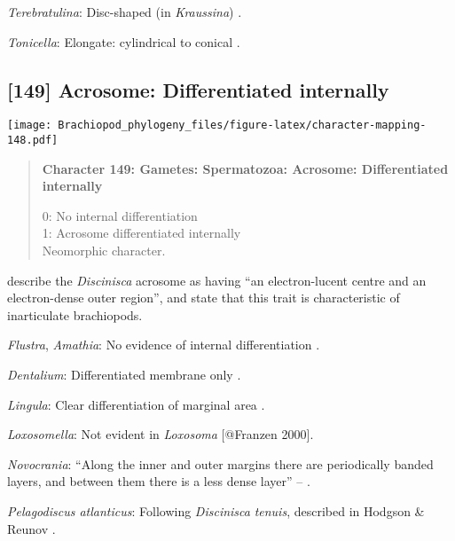 \documentclass[openany]{book}
\theoremstyle{definition}
\theoremstyle{definition}
\theoremstyle{definition}
\theoremstyle{remark}
\begin{document}
\hypertarget{Terebratulina-coding-148}{}
\emph{Terebratulina}: Disc-shaped (in \emph{Kraussina})
\citep{Hodgson1994Ultrastructureof}.

\hypertarget{Tonicella-coding-148}{}
\emph{Tonicella}: Elongate: cylindrical to conical
\citep{BucklandNicks1988}.

\subsection*{{[}149{]} Acrosome: Differentiated
internally}\label{acrosome-differentiated-internally}

\texttt{[image: Brachiopod\_phylogeny\_files/figure-latex/character-mapping-148.pdf]}

\begin{quote}
\textbf{Character 149: Gametes: Spermatozoa: Acrosome: Differentiated
internally}

0: No internal differentiation\\
1: Acrosome differentiated internally\\
Neomorphic character.
\end{quote}

\citet{Hodgson1994Ultrastructureof} describe the \emph{Discinisca}
acrosome as having ``an electron-lucent centre and an electron-dense
outer region'', and state that this trait is characteristic of
inarticulate brachiopods.

\hypertarget{Amathia-coding-149}{}
\emph{Flustra}, \emph{Amathia}: No evidence of internal differentiation
\citep[in \emph{Tubulipora};][]{Franzen1984}.

\hypertarget{Dentalium-coding-149}{}
\emph{Dentalium}: Differentiated membrane only \citep{DufresneDube1983}.

\hypertarget{Lingula-coding-149}{}
\emph{Lingula}: Clear differentiation of marginal area
\citep{Fukumoto2003Theacrosome}.

\hypertarget{Loxosomella-coding-149}{}
\emph{Loxosomella}: Not evident in \emph{Loxosoma} {[}@Franzen 2000{]}.

\hypertarget{Novocrania-coding-149}{}
\emph{Novocrania}: ``Along the inner and outer margins there are
periodically banded layers, and between them there is a less dense
layer'' -- \citet{Afzelius1978Finestructure}.

\hypertarget{Pelagodiscus_atlanticus-coding-149}{}
\emph{Pelagodiscus atlanticus}: Following \emph{Discinisca}
\emph{tenuis}, described in Hodgson \& Reunov
\citeyearpar{Hodgson1994Ultrastructureof}.
\end{document}
